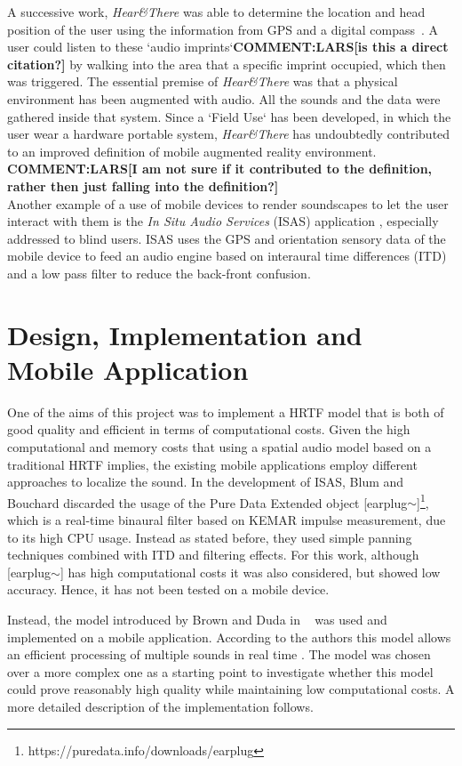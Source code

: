 \documentclass[journal]{IEEEtran}
\begin{document}
A successive work, \emph{Hear\&There} was able to determine the location and head position of the user using the information from GPS and a digital compass~\cite{rozier2000}. A user could listen to these `audio imprints`\textbf{COMMENT:LARS[is this a direct citation?]} by walking into the area that a specific imprint occupied, which then was triggered. The essential premise of \emph{Hear\&There} was that a physical environment has been augmented with audio. All the sounds and the data were gathered inside that system. Since a `Field Use` has been developed, in which the user wear a hardware portable system, \emph{Hear\&There} has undoubtedly contributed to an improved definition of mobile augmented reality environment. \textbf{COMMENT:LARS[I am not sure if it contributed to the definition, rather then just falling into the definition?]}\\

Another example of a use of mobile devices to render soundscapes to let the user interact with them is the \emph{In Situ Audio Services} (ISAS) application \cite{aroundMe}, especially addressed to blind users. ISAS uses the GPS and orientation sensory data of the mobile device to feed an audio engine based on interaural time differences (ITD) and a low pass filter to reduce the back-front confusion.

\section{Design, Implementation and Mobile Application}

One of the aims of this project was to implement a HRTF model that is both of good quality and efficient in terms of computational costs. Given the high computational and memory costs that using a spatial audio model based on a traditional HRTF implies, the existing mobile applications employ different approaches to localize the sound. In the development of ISAS, Blum and Bouchard discarded the usage of the Pure Data Extended object [earplug$\sim$]\footnote{https://puredata.info/downloads/earplug}, which is a real-time binaural filter based on KEMAR impulse measurement, due to its high CPU usage. Instead as stated before, they used simple panning techniques combined with ITD and filtering effects. For this work, although [earplug$\sim$] has high computational costs it was also considered, but showed low accuracy. Hence, it has not been tested on a mobile device.

Instead, the model introduced by Brown and Duda in ~\cite{Brown1997} was used and implemented on a mobile application. According to the authors this model allows an efficient processing of multiple sounds in real time \cite{Brown1997}. The model was chosen over a more complex one as a starting point to investigate whether this model could prove reasonably high quality while maintaining low computational costs. A more detailed description of the implementation follows.
\end{document}
